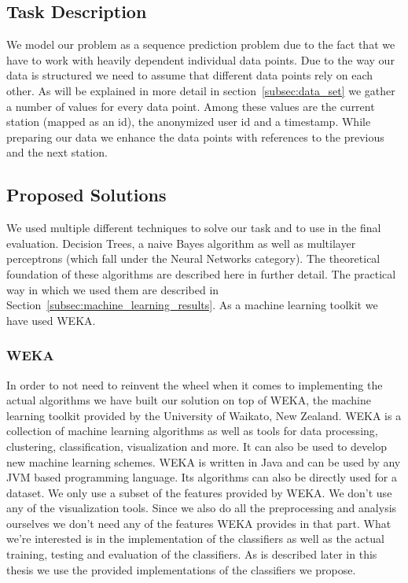 \subsection{Task Description}
\label{subsec:task_description}
We model our problem as a sequence prediction problem due to the fact that we have to work with heavily dependent individual data points. Due to the way our data is structured we need to assume that different data points rely on each other. As will be explained in more detail in section~\ref{subsec:data_set} we gather a number of values for every data point. Among these values are the current station (mapped as an id), the anonymized user id and a timestamp. While preparing our data we enhance the data points with references to the previous and the next station.


\subsection{Proposed Solutions}
\label{subsec:proposed_solution}
We used multiple different techniques to solve our task and to use in the final evaluation. Decision Trees, a naive Bayes algorithm as well as multilayer perceptrons (which fall under the Neural Networks category). The theoretical foundation of these algorithms are described here in further detail. The practical way in which we used them are described in Section~\ref{subsec:machine_learning_results}. As a machine learning toolkit we have used WEKA.

\subsubsection{WEKA}
In order to not need to reinvent the wheel when it comes to implementing the actual algorithms we have built our solution on top of WEKA, the machine learning toolkit provided by the University of Waikato, New Zealand. WEKA is a collection of machine learning algorithms as well as tools for data processing, clustering, classification, visualization and more. It can also be used to develop new machine learning schemes. WEKA is written in Java and can be used by any JVM based programming language. Its algorithms can also be directly used for a dataset. We only use a subset of the features provided by WEKA. We don't use any of the visualization tools. Since we also do all the preprocessing and analysis ourselves we don't need any of the features WEKA provides in that part. What we're interested is in the implementation of the classifiers as well as the actual training, testing and evaluation of the classifiers. As is described later in this thesis we use the provided implementations of the classifiers we propose. 

